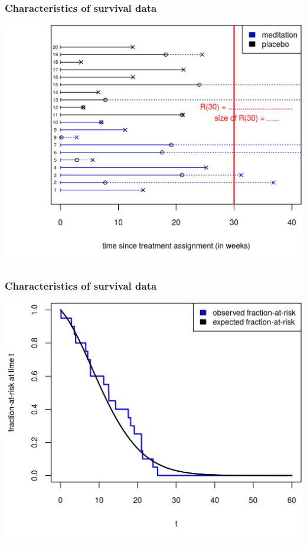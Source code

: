 \documentclass[12pt, 
hyperref={colorlinks=true, linkcolor=blue, urlcolor=cyan},dvipsnames]{beamer}
\begin{document}
\begin{frame}
\frametitle{Characteristics of survival data}
\begin{center}
\includegraphics[height=0.8\textheight]{figs/risk_set_movie_6.png}
\end{center}
\end{frame}

\begin{frame}
\frametitle{Characteristics of survival data}
\begin{center}
\includegraphics[height=0.8\textheight]{figs/risk_set.png}
\end{center}
\end{frame}
\end{document}
